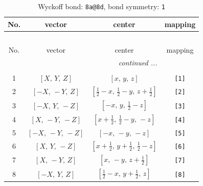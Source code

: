 \documentclass[fleqn,8pt]{jsarticle}
\begin{document}
\begin{longtable}{cccc}
\caption{Wyckoff bond: {\tt 8a@8d}, bond symmetry: {\tt 1}}
 \\
 \hline \hline
No. & vector & center & mapping \\ \hline \endfirsthead

\multicolumn{3}{l}{\tablename\ \thetable{}} \\
 \hline \hline
No. & vector & center & mapping \\ \hline \endhead

 \hline \hline
\multicolumn{3}{r}{\footnotesize\it continued ...} \\ \endfoot

 \hline \hline
\multicolumn{3}{r}{} \\ \endlastfoot

1 & $\left[ X,\, Y,\, Z \right]$ & $\left[ x,\, y,\, z \right]$ & {\tt [1]} \\ \hline
2 & $\left[ - X,\, - Y,\, Z \right]$ & $\left[ \frac{1}{2} - x,\, \frac{1}{2} - y,\, z + \frac{1}{2} \right]$ & {\tt [2]} \\ \hline
3 & $\left[ - X,\, Y,\, - Z \right]$ & $\left[ - x,\, y,\, \frac{1}{2} - z \right]$ & {\tt [3]} \\ \hline
4 & $\left[ X,\, - Y,\, - Z \right]$ & $\left[ x + \frac{1}{2},\, \frac{1}{2} - y,\, - z \right]$ & {\tt [4]} \\ \hline
5 & $\left[ - X,\, - Y,\, - Z \right]$ & $\left[ - x,\, - y,\, - z \right]$ & {\tt [5]} \\ \hline
6 & $\left[ X,\, Y,\, - Z \right]$ & $\left[ x + \frac{1}{2},\, y + \frac{1}{2},\, \frac{1}{2} - z \right]$ & {\tt [6]} \\ \hline
7 & $\left[ X,\, - Y,\, Z \right]$ & $\left[ x,\, - y,\, z + \frac{1}{2} \right]$ & {\tt [7]} \\ \hline
8 & $\left[ - X,\, Y,\, Z \right]$ & $\left[ \frac{1}{2} - x,\, y + \frac{1}{2},\, z \right]$ & {\tt [8]} \\
\end{longtable}
\end{document}
